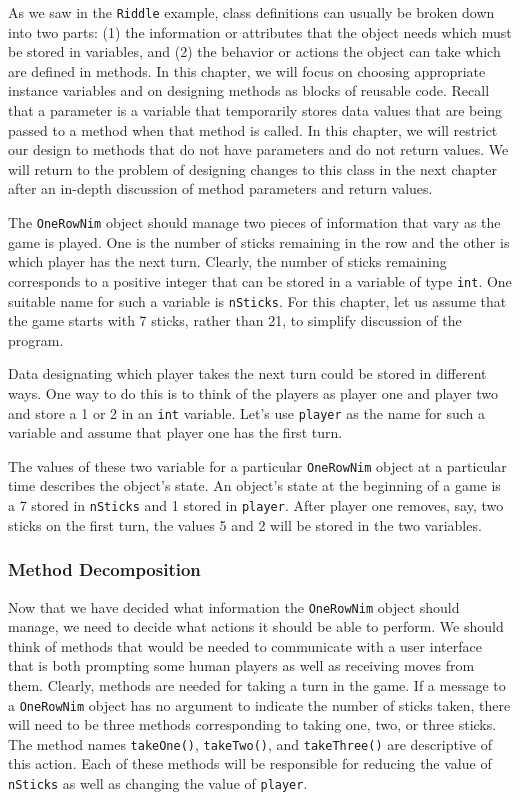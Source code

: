 \noindent As we saw in the {\tt Riddle} example, class definitions can
usually be broken down into two parts: (1) the information or
attributes that the object needs which must be stored in variables,
and (2) the behavior or actions the object can take which are defined
in methods.  In this chapter, we will focus on choosing appropriate
instance variables and on designing methods as blocks of reusable
code.  Recall that a parameter is a variable that temporarily stores
data values that are being passed to a method when that method is
called.  In this chapter, we will restrict our design to methods that
do not have parameters and do not return values.  We will return to
the problem of designing changes to this class in the next chapter
after an in-depth discussion of method parameters and return values.

The  {\tt OneRowNim} object should manage two pieces of information
that vary as the game is played.  One is the number of sticks
remaining in the row and the other is which player has the next turn.
Clearly, the number of sticks remaining corresponds to a positive
integer that can be stored in a variable of type {\tt int}.  One
suitable name for such a variable is {\tt nSticks}. For this chapter,
let us assume that the game starts with 7 sticks, rather than 21, to
simplify discussion of the program.

Data designating which player takes the next turn could be stored in
different ways.  One way to do this is to think of the players as
player one and player two and store a 1 or 2 in an {\tt int} variable.
Let's use {\tt player} as the name for such a variable and assume that
player one has the first turn.

The values of these two variable for a particular {\tt OneRowNim}
object at a particular time describes the object's state. An object's
state at the beginning of a game is a 7 stored in {\tt nSticks} and 1
stored in {\tt player}.  After player one removes, say, two sticks on
the first turn, the values 5 and 2 will be stored in the two
variables.

\subsubsection*{Method Decomposition}

\noindent Now that we have decided what information the {\tt OneRowNim}
object should manage, we need to decide what actions it should be able
to perform.  We should think of methods that would be needed to
communicate with a user interface that is both prompting some human
players as well as receiving moves from them.
Clearly, methods are needed for taking a turn in the game.  If a
message to a {\tt OneRowNim} object has no argument to indicate the
number of sticks taken, there will need to be three methods
corresponding to taking one, two, or three sticks.  The method names
{\tt takeOne()}, {\tt takeTwo()}, and {\tt takeThree()} are
descriptive of this action.  Each of these methods will be responsible
for reducing the value of {\tt nSticks} as well as changing the value
of {\tt player}.

